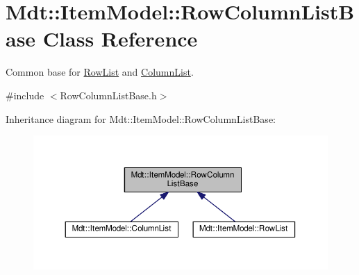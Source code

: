 \hypertarget{class_mdt_1_1_item_model_1_1_row_column_list_base}{}\section{Mdt\+:\+:Item\+Model\+:\+:Row\+Column\+List\+Base Class Reference}
\label{class_mdt_1_1_item_model_1_1_row_column_list_base}


Common base for \hyperlink{class_mdt_1_1_item_model_1_1_row_list}{Row\+List} and \hyperlink{class_mdt_1_1_item_model_1_1_column_list}{Column\+List}.  




{\ttfamily \#include $<$Row\+Column\+List\+Base.\+h$>$}



Inheritance diagram for Mdt\+:\+:Item\+Model\+:\+:Row\+Column\+List\+Base\+:\nopagebreak
\begin{figure}[H]
\begin{center}
\leavevmode
\includegraphics[width=350pt]{class_mdt_1_1_item_model_1_1_row_column_list_base__inherit__graph}
\end{center}
\end{figure}
